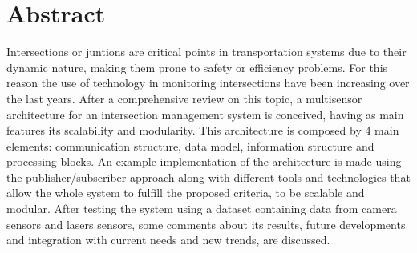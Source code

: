 \documentclass{book}
\begin{document}



%

\chapter*{Abstract}
%
Intersections or juntions are critical points in transportation systems due to their dynamic nature, making them prone to safety or efficiency problems. For this reason the use of technology in monitoring intersections have been increasing over the last years. After a comprehensive review on this topic, a  multisensor architecture for an intersection management system is conceived, having as main features its scalability and modularity. This architecture is composed by 4 main elements: communication structure, data model, information structure and processing blocks. An example implementation of the architecture is made using the publisher/subscriber approach along with different tools and technologies that allow the whole system to fulfill the proposed criteria, to be scalable and modular. After testing the system using a dataset containing data from camera sensors and lasers sensors, some comments about its results, future developments and integration with current needs and new trends, are discussed.





\tableofcontents
\setcounter{tocdepth}{3}

\listoffigures

\listoftables














%
\end{document}
